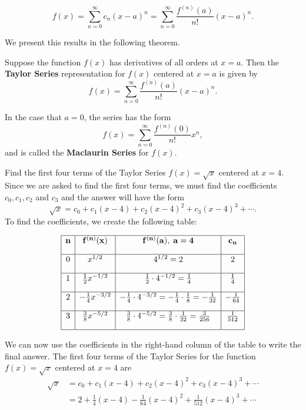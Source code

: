 \documentclass[handout]{ximera}
\begin{document}
\[
f(x) = \sum_{n=0}^\infty c_n (x-a)^n = \sum_{n=0}^\infty \frac{f^{(n)}(a)}{n!} (x-a)^n.
\]


We present this results in the following theorem.

\begin{theorem}
Suppose the function $f(x)$ has derivatives of all orders at $x = a$. Then the \textbf{Taylor Series} 
representation for $f(x)$ centered at $x = a$ is given by
\[
f(x) = \sum_{n=0}^\infty \frac{f^{(n)}(a)}{n!} (x-a)^n.
\]

 In the case that $a = 0$, the series has the form
\[
 f(x) = \sum_{n=0}^\infty \frac{f^{(n)}(0)}{n!} x^n,
\]
and is called the \textbf{Maclaurin Series} for $f(x)$.
\end{theorem}

\begin{example}[example 1] Find the first four terms of the Taylor Series $f(x) = \sqrt x$ centered at $x = 4$.\\
Since we are asked to find the first four terms, we must find the coefficients $c _0, c_1, c_2$ and $c_3$
and the answer will have the form 
\[
\sqrt x = c_0 + c_1(x-4) + c_2(x-4)^2 + c_3(x-4)^3 + \cdots .
\]
To find the coefficients, we create the following table:

\[
\begin{array}{|c|c|c|c|} 
\hline
\bf{n} & \bf{f^{(n)}(x)} & \bf{f^{(n)}(a), \; a = 4} & \bf{c_n} \\[1em] 
\hline
 0 & x^{1/2} & 4^{1/2} = 2 & 2 \\[1em]
\hline
1 & \frac12 x^{-1/2} & \frac12 \cdot 4^{-1/2} = \frac14 & \frac14 \\[1em]
\hline
 2 & -\frac14 x^{-3/2} & -\frac14 \cdot 4^{-3/2} 
= -\frac14 \cdot \frac18 = -\frac{1}{32} & -\frac{1}{64} \\[1em]
\hline
 3 & \frac38 x^{-5/2} & \frac38 \cdot 4^{-5/2} = \frac38 \cdot \frac{1}{32} = \frac{3}{256} & \frac{1}{512}\\[1em]
\hline
\end{array}
\]



We can now use the coefficients in the right-hand column of the table to write the final answer. 
The first four terms of the Taylor Series for the function $f(x) = \sqrt x$ centered at $x = 4$ are
\begin{align*}
\sqrt x &= c_0 + c_1(x-4) + c_2(x-4)^2 + c_3(x-4)^3 + \cdots \\
        &= 2 + \frac14(x-4) -\frac{1}{64}(x-4)^2 + \frac{1}{512}(x-4)^3 + \cdots
\end{align*}

\end{example}
\end{document}
